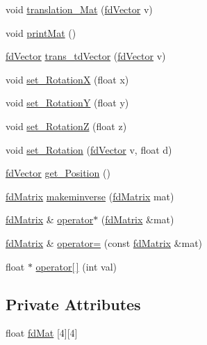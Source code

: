 \begin{DoxyCompactItemize}
\item 
void \hyperlink{classfd_matrix_a7bcd04441070be5ba144dc58b88947bc}{translation\+\_\+\+Mat} (\hyperlink{classfd_vector}{fd\+Vector} v)
\item 
void \hyperlink{classfd_matrix_a65bc1f60c320690dd6b65a27b516c8f0}{print\+Mat} ()
\item 
\hyperlink{classfd_vector}{fd\+Vector} \hyperlink{classfd_matrix_af043c14d7fbe5f0e7b34e621719f7fed}{trans\+\_\+td\+Vector} (\hyperlink{classfd_vector}{fd\+Vector} v)
\item 
void \hyperlink{classfd_matrix_aeae2bebcd762033ea77cbe12d4fb2354}{set\+\_\+\+RotationX} (float x)
\item 
void \hyperlink{classfd_matrix_ac219a2f9fb42b0d7265bc47f18e1e748}{set\+\_\+\+RotationY} (float y)
\item 
void \hyperlink{classfd_matrix_a17251b926dd6ae66fc367b0fdf162774}{set\+\_\+\+RotationZ} (float z)
\item 
void \hyperlink{classfd_matrix_af2581305baad7d1e9eb25d3ac1c457b6}{set\+\_\+\+Rotation} (\hyperlink{classfd_vector}{fd\+Vector} v, float d)
\item 
\hyperlink{classfd_vector}{fd\+Vector} \hyperlink{classfd_matrix_af955a03dc22bb94e5541f7d1ce52bb15}{get\+\_\+\+Position} ()
\item 
\hyperlink{classfd_matrix}{fd\+Matrix} \hyperlink{classfd_matrix_a833472cadd1c6a9caac01741ad5ab9f6}{makeminverse} (\hyperlink{classfd_matrix}{fd\+Matrix} mat)
\item 
\hyperlink{classfd_matrix}{fd\+Matrix} \& \hyperlink{classfd_matrix_a5452efb88f91f98a5cd80ce8e394c3f6}{operator$\ast$} (\hyperlink{classfd_matrix}{fd\+Matrix} \&mat)
\item 
\hyperlink{classfd_matrix}{fd\+Matrix} \& \hyperlink{classfd_matrix_a9bd773f3db300618603c63e54b2bb43d}{operator=} (const \hyperlink{classfd_matrix}{fd\+Matrix} \&mat)
\item 
float $\ast$ \hyperlink{classfd_matrix_af1431514b36a3949f2e8ac58c8a79466}{operator\mbox{[}$\,$\mbox{]}} (int val)
\end{DoxyCompactItemize}
\subsection*{Private Attributes}
\begin{DoxyCompactItemize}
\item 
float \hyperlink{classfd_matrix_aef4a5dc37e53c1e5a2b5f811ba675c93}{fd\+Mat} \mbox{[}4\mbox{]}\mbox{[}4\mbox{]}
\end{DoxyCompactItemize}


